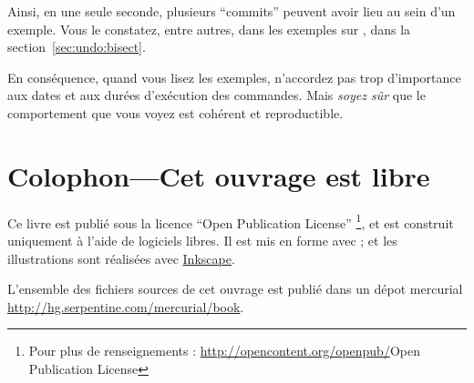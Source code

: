Ainsi, en une seule seconde, plusieurs ``commits'' peuvent avoir lieu
au sein d'un exemple. Vous le constatez, entre autres, dans les 
exemples sur , dans la section~\ref{sec:undo:bisect}.

En conséquence, quand vous lisez les exemples, n'accordez pas trop
d'importance aux dates et aux durées d'exécution des commandes. Mais
\emph{soyez sûr} que le comportement que vous voyez est cohérent et
reproductible.

\section{Colophon---Cet ouvrage est libre}

Ce livre est publié sous la licence ``Open Publication License''
\footnote{Pour plus de renseignements : 
\url{http://opencontent.org/openpub/}{Open Publication License} }, 
et est construit uniquement à l'aide de logiciels libres. Il est mis
en forme avec \LaTex{}; et les illustrations sont réalisées avec 
\href{http://www.inkscape.org/}{Inkscape}.

L'ensemble des fichiers sources de cet ouvrage est publié dans un
dépot mercurial  \url{http://hg.serpentine.com/mercurial/book}.

